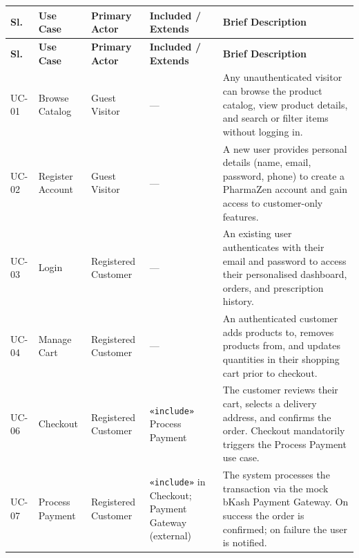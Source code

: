 \documentclass[12pt, a4paper]{article}
\begin{document}
\begin{longtable}{|C{0.8cm}|L{2.4cm}|L{3.0cm}|L{3.2cm}|L{5.8cm}|}
  \hline
  \textbf{\color{white}\small Sl.} &
  \textbf{\color{white}\small Use Case} &
  \textbf{\color{white}\small Primary Actor} &
  \textbf{\color{white}\small Included / Extends} &
  \textbf{\color{white}\small Brief Description} \\
  \hline
  \endfirsthead
  \hline
  \textbf{\color{white}\small Sl.} &
  \textbf{\color{white}\small Use Case} &
  \textbf{\color{white}\small Primary Actor} &
  \textbf{\color{white}\small Included / Extends} &
  \textbf{\color{white}\small Brief Description} \\
  \hline
  \endhead

  \small UC-01 &
  \small Browse Catalog &
  \small Guest Visitor &
  \small --- &
  \small Any unauthenticated visitor can browse the product catalog, view product details, and search or filter items without logging in. \\
  \hline

  \small UC-02 &
  \small Register Account &
  \small Guest Visitor &
  \small --- &
  \small A new user provides personal details (name, email, password, phone) to create a PharmaZen account and gain access to customer-only features. \\
  \hline

  \small UC-03 &
  \small Login &
  \small Registered Customer &
  \small --- &
  \small An existing user authenticates with their email and password to access their personalised dashboard, orders, and prescription history. \\
  \hline

  \small UC-04 &
  \small Manage Cart &
  \small Registered Customer &
  \small --- &
  \small An authenticated customer adds products to, removes products from, and updates quantities in their shopping cart prior to checkout. \\
  \hline

  \small UC-06 &
  \small Checkout &
  \small Registered Customer &
  \small \texttt{«include»} Process Payment &
  \small The customer reviews their cart, selects a delivery address, and confirms the order. Checkout mandatorily triggers the Process Payment use case. \\
  \hline

  \small UC-07 &
  \small Process Payment &
  \small Registered Customer &
  \small \texttt{«include»} in Checkout; Payment Gateway (external) &
  \small The system processes the transaction via the mock bKash Payment Gateway. On success the order is confirmed; on failure the user is notified. \\
  \hline


\end{longtable}
\end{document}
